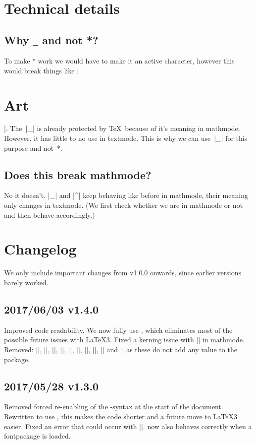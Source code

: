 \documentclass[11pt, cm-default]{l3doc}
\begin{document}
	\section{Technical details}
	\subsection{Why \texttt{\_} and not *?\label{Why?!}}
	To make * work we would have to make it an active character, however this would break things like |\section*{Art}|. The~|_| is already protected by \TeX\ because of it's meaning in mathmode. However, it has little to no use in textmode. This is why we can use~|_| for this purpose and not~*.
	
	\subsection{Does this break mathmode?}
	No it doesn't. |_| and |^| keep behaving like before in mathmode, their meaning only changes in textmode. (We first check whether we are in mathmode or not and then behave accordingly.)


	\section{Changelog}
	We only include important changes from v1.0.0 onwards, since earlier versions barely worked.

	\subsection*{2017/06/03 v1.4.0}
	Improved code readability.
	We now fully use , which eliminates most of the possible future issues with \LaTeX3.
	Fixed a kerning issue with |\cir| in mathmode.
	Removed: |\setundact|, |\setundsub|, |\setciract|, |\setcirsup|, |\nrfamily|, |\nrshape|, |\nrseries|, |\setffamily|, |\setfshape| and |\setfseries| as these do not add any value to the package.

	\subsection*{2017/05/28 v1.3.0}
	Removed forced re-enabling of the -syntax at the start of the document.
	Rewritten to use , this makes the code shorter and a future move to \LaTeX3 easier.
	Fixed an error that could occur with |\cir|.
	 now also behaves correctly when a fontpackage is loaded.
\end{document}
